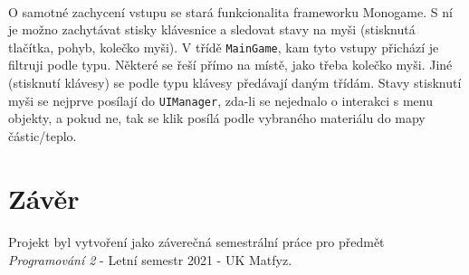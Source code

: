 \documentclass[a4paper, 12pt]{article}
\begin{document}
\paragraph{} 
O samotné zachycení vstupu se stará funkcionalita frameworku Monogame. S ní je
možno zachytávat stisky klávesnice a sledovat stavy na myši (stisknutá
tlačítka, pohyb, kolečko myši). V třídě \texttt{MainGame}, kam tyto vstupy
přichází je filtruji podle typu. Některé se řeší přímo na místě, jako třeba
kolečko myši. Jiné (stisknutí klávesy) se podle typu klávesy předávají daným
třídám. Stavy stisknutí myši se nejprve posílají do \texttt{UIManager}, zda-li
se nejednalo o interakci s menu objekty, a pokud ne, tak se klik posílá podle
vybraného materiálu do mapy částic/teplo.


\newpage
\section{Závěr}
\paragraph{}
Projekt byl vytvoření jako záverečná semestrální práce pro předmět
\\\emph{Programování 2} - Letní semestr 2021 - UK Matfyz.
\end{document}
